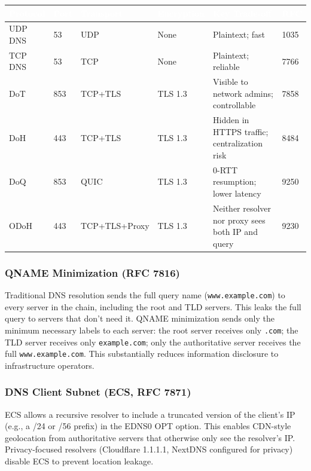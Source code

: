 \documentclass[11pt,letterpaper]{article}
\newcommand{\tableheader}[1]{\textbf{\sffamily\textcolor{white}{#1}}}
\begin{document}
\begin{center}
\begin{tabularx}{\textwidth}{L{2cm}C{1.8cm}C{2cm}C{2cm}XC{1.5cm}}
\toprule
{}
\tableheader{Protocol} & \tableheader{Port} & \tableheader{Transport} & \tableheader{Encryption} & \tableheader{Key Trade-off} & \tableheader{RFC} \\
\midrule
UDP DNS & 53 & UDP & None & Plaintext; fast & 1035 \\
TCP DNS & 53 & TCP & None & Plaintext; reliable & 7766 \\
DoT & 853 & TCP+TLS & TLS 1.3 & Visible to network admins; controllable & 7858 \\
DoH & 443 & TCP+TLS & TLS 1.3 & Hidden in HTTPS traffic; centralization risk & 8484 \\
DoQ & 853 & QUIC & TLS 1.3 & 0-RTT resumption; lower latency & 9250 \\
ODoH & 443 & TCP+TLS+Proxy & TLS 1.3 & Neither resolver nor proxy sees both IP and query & 9230 \\
\bottomrule
\end{tabularx}
\end{center}

\subsubsection{QNAME Minimization (RFC 7816)}

Traditional DNS resolution sends the full query name (\texttt{www.example.com}) to every server in the chain, including the root and TLD servers. This leaks the full query to servers that don't need it. QNAME minimization sends only the minimum necessary labels to each server: the root server receives only \texttt{.com}; the TLD server receives only \texttt{example.com}; only the authoritative server receives the full \texttt{www.example.com}. This substantially reduces information disclosure to infrastructure operators.

\subsubsection{DNS Client Subnet (ECS, RFC 7871)}

ECS allows a recursive resolver to include a truncated version of the client's IP (e.g., a /24 or /56 prefix) in the EDNS0 OPT option. This enables CDN-style geolocation from authoritative servers that otherwise only see the resolver's IP. Privacy-focused resolvers (Cloudflare 1.1.1.1, NextDNS configured for privacy) disable ECS to prevent location leakage.
\end{document}
